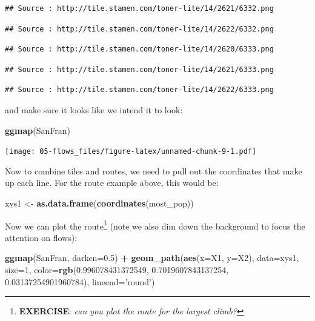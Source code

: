 \documentclass[
]{book}
\newenvironment{Shaded}{\begin{snugshade}}{\end{snugshade}}
\newcommand{\DataTypeTok}[1]{\textcolor[rgb]{0.13,0.29,0.53}{#1}}
\newcommand{\DecValTok}[1]{\textcolor[rgb]{0.00,0.00,0.81}{#1}}
\newcommand{\FloatTok}[1]{\textcolor[rgb]{0.00,0.00,0.81}{#1}}
\newcommand{\KeywordTok}[1]{\textcolor[rgb]{0.13,0.29,0.53}{\textbf{#1}}}
\newcommand{\NormalTok}[1]{#1}
\newcommand{\OperatorTok}[1]{\textcolor[rgb]{0.81,0.36,0.00}{\textbf{#1}}}
\newcommand{\StringTok}[1]{\textcolor[rgb]{0.31,0.60,0.02}{#1}}
\begin{document}
\begin{verbatim}
## Source : http://tile.stamen.com/toner-lite/14/2621/6332.png
\end{verbatim}

\begin{verbatim}
## Source : http://tile.stamen.com/toner-lite/14/2622/6332.png
\end{verbatim}

\begin{verbatim}
## Source : http://tile.stamen.com/toner-lite/14/2620/6333.png
\end{verbatim}

\begin{verbatim}
## Source : http://tile.stamen.com/toner-lite/14/2621/6333.png
\end{verbatim}

\begin{verbatim}
## Source : http://tile.stamen.com/toner-lite/14/2622/6333.png
\end{verbatim}

and make sure it looks like we intend it to look:

\begin{Shaded}
\begin{Highlighting}[]
\KeywordTok{ggmap}\NormalTok{(SanFran)}
\end{Highlighting}
\end{Shaded}

\texttt{[image: 05-flows\_files/figure-latex/unnamed-chunk-9-1.pdf]}

Now to combine tiles and routes, we need to pull out the coordinates that make up each line. For the route example above, this would be:

\begin{Shaded}
\begin{Highlighting}[]
\NormalTok{xys1 <-}\StringTok{ }\KeywordTok{as.data.frame}\NormalTok{(}\KeywordTok{coordinates}\NormalTok{(most_pop))}
\end{Highlighting}
\end{Shaded}

Now we can plot the route\footnote{\textbf{EXERCISE}: \emph{can you plot the route for the largest climb?}} (note we also dim down the background to focus the attention on flows):

\begin{Shaded}
\begin{Highlighting}[]
\KeywordTok{ggmap}\NormalTok{(SanFran, }\DataTypeTok{darken=}\FloatTok{0.5}\NormalTok{) }\OperatorTok{+}\StringTok{ }
\StringTok{  }\KeywordTok{geom_path}\NormalTok{(}\KeywordTok{aes}\NormalTok{(}\DataTypeTok{x=}\NormalTok{X1, }\DataTypeTok{y=}\NormalTok{X2), }
            \DataTypeTok{data=}\NormalTok{xys1,}
            \DataTypeTok{size=}\DecValTok{1}\NormalTok{,}
            \DataTypeTok{color=}\KeywordTok{rgb}\NormalTok{(}\FloatTok{0.996078431372549}\NormalTok{, }\FloatTok{0.7019607843137254}\NormalTok{, }\FloatTok{0.03137254901960784}\NormalTok{),}
            \DataTypeTok{lineend=}\StringTok{'round'}\NormalTok{)}
\end{Highlighting}
\end{Shaded}
\end{document}
